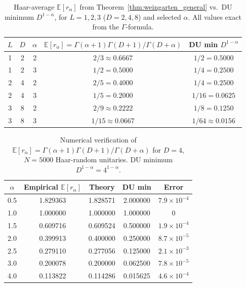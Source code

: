 \documentclass[12pt,a4paper]{article}
\begin{document}
\begin{table}[h!]
\centering
\caption{Haar-average $\mathbb{E}[r_\alpha]$ from Theorem~\ref{thm:weingarten_general}
vs.\ DU minimum $D^{1-\alpha}$, for $L=1,2,3$ ($D=2,4,8$) and selected $\alpha$.
All values exact from the $\Gamma$-formula.}
\label{tab:haar_general}
\begin{tabular}{c|c|c|c|c}
$L$ & $D$ & $\alpha$ & $\mathbb{E}[r_\alpha]=\Gamma(\alpha+1)\Gamma(D+1)/\Gamma(D+\alpha)$
 & DU min $D^{1-\alpha}$ \\
\hline
1 & 2 & 2 & $2/3\approx0.6667$ & $1/2=0.5000$ \\
1 & 2 & 3 & $1/2=0.5000$ & $1/4=0.2500$ \\
\hline
2 & 4 & 2 & $2/5=0.4000$ & $1/4=0.2500$ \\
2 & 4 & 3 & $1/5=0.2000$ & $1/16=0.0625$ \\
\hline
3 & 8 & 2 & $2/9\approx0.2222$ & $1/8=0.1250$ \\
3 & 8 & 3 & $1/15\approx0.0667$ & $1/64\approx0.0156$ \\
\end{tabular}
\end{table}

\begin{table}[h!]
\centering
\caption{Numerical verification of $\mathbb{E}[r_\alpha]=\Gamma(\alpha+1)\Gamma(D+1)/\Gamma(D+\alpha)$
for $D=4$, $N=5000$ Haar-random unitaries. DU minimum $D^{1-\alpha}=4^{1-\alpha}$.}
\label{tab:haar_D4}
\begin{tabular}{c|c|c|c|c}
$\alpha$ & Empirical $\mathbb{E}[r_\alpha]$ & Theory & DU min & Error \\
\hline
0.5 & 1.829363 & 1.828571 & 2.000000 & $7.9\times10^{-4}$ \\
1.0 & 1.000000 & 1.000000 & 1.000000 & $0$ \\
1.5 & 0.609716 & 0.609524 & 0.500000 & $1.9\times10^{-4}$ \\
2.0 & 0.399913 & 0.400000 & 0.250000 & $8.7\times10^{-5}$ \\
2.5 & 0.279110 & 0.277056 & 0.125000 & $2.1\times10^{-3}$ \\
3.0 & 0.200078 & 0.200000 & 0.062500 & $7.8\times10^{-5}$ \\
4.0 & 0.113822 & 0.114286 & 0.015625 & $4.6\times10^{-4}$ \\
\end{tabular}
\end{table}

\end{document}
